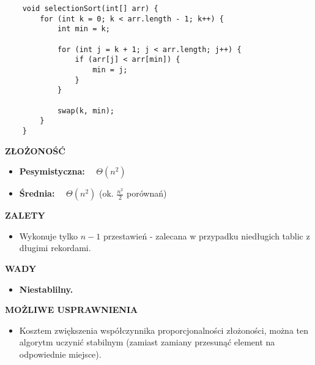 \documentclass[simple-sorts.tex]{subfiles}
\begin{document}
    \begin{verbatim}
    void selectionSort(int[] arr) {
        for (int k = 0; k < arr.length - 1; k++) {
            int min = k;

            for (int j = k + 1; j < arr.length; j++) {
                if (arr[j] < arr[min]) {
                    min = j;
                }
            }

            swap(k, min);
        }
    }
    \end{verbatim}

    \textbf{ZŁOŻONOŚĆ}
    \begin{itemize}
        \item \textbf{Pesymistyczna:} ~~$\Theta(n^2)$
        \item \textbf{Średnia:} ~~$\Theta(n^2)$ (ok. $\frac{n^2}{2}$
            porównań)
    \end{itemize}

    \textbf{ZALETY}
    \begin{itemize}
        \item Wykonuje tylko $n-1$ przestawień - zalecana w przypadku niedługich
            tablic z długimi rekordami.
    \end{itemize}

    \textbf{WADY}
    \begin{itemize}
        \item \textbf{Niestablilny.}
    \end{itemize}

    \textbf{MOŻLIWE USPRAWNIENIA}
    \begin{itemize}
        \item Kosztem zwiększenia współczynnika proporcjonalności złożoności,
            można ten algorytm uczynić stabilnym (zamiast zamiany przesunąć
            element na odpowiednie miejsce).
    \end{itemize}
\end{document}
